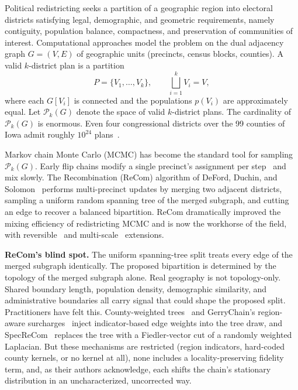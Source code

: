 \documentclass[11pt]{article}
\begin{document}
Political redistricting seeks a partition of a geographic region into
electoral districts satisfying legal, demographic, and geometric
requirements, namely contiguity, population balance, compactness, and
preservation of communities of interest. Computational approaches model
the problem on the dual adjacency graph $G = (V,E)$ of geographic units
(precincts, census blocks, counties). A valid $k$-district plan is a
partition
\[
  P = \{V_1, \ldots, V_k\}, \qquad \bigsqcup_{i=1}^k V_i = V,
\]
where each $G[V_i]$ is connected and the populations $p(V_i)$ are
approximately equal. Let $\mathcal{P}_k(G)$ denote the space of valid
$k$-district plans. The cardinality of $\mathcal{P}_k(G)$ is enormous.
Even four congressional districts over the 99 counties of Iowa admit
roughly $10^{24}$ plans~\cite{fifield2020essential}.

Markov chain Monte Carlo (MCMC) has become the standard tool for
sampling $\mathcal{P}_k(G)$. Early flip chains modify a single
precinct's assignment per step~\cite{fifield2020automated} and mix
slowly. The Recombination (ReCom) algorithm of DeFord, Duchin, and
Solomon~\cite{deford2021recombination} performs multi-precinct updates
by merging two adjacent districts, sampling a uniform random spanning
tree of the merged subgraph, and cutting an edge to recover a balanced
bipartition. ReCom dramatically improved the mixing efficiency of
redistricting MCMC and is now the workhorse of the field, with
reversible~\cite{cannon2022spanning} and multi-scale~\cite{autry2020multiscale}
extensions.

\textbf{ReCom's blind spot.} The uniform spanning-tree split treats
every edge of the merged subgraph identically. The proposed
bipartition is determined by the topology of the merged subgraph
alone. Real geography is not topology-only. Shared boundary
length, population density, demographic similarity, and
administrative boundaries all carry signal that could shape the
proposed split. Practitioners have felt this. County-weighted
trees~\cite{clelland2022colorado} and GerryChain's region-aware
surcharges~\cite{gerrychain2024} inject indicator-based edge weights
into the tree draw, and SpecReCom~\cite{davies2025spectral} replaces
the tree with a Fiedler-vector cut of a randomly weighted Laplacian.
But these mechanisms are restricted (region indicators, hard-coded
county kernels, or no kernel at all), none includes a
locality-preserving fidelity term, and, as their authors
acknowledge, each shifts the chain's stationary distribution in
an uncharacterized, uncorrected way.
\end{document}
